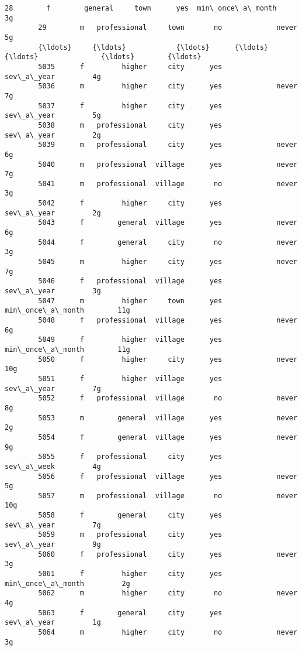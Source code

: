 \documentclass[11pt]{article}
\begin{document}
\begin{Verbatim}[commandchars=\\\{\}]
        28        f        general     town      yes  min\_once\_a\_month         3g   
        29        m   professional     town       no             never         5g   
        {\ldots}     {\ldots}            {\ldots}      {\ldots}      {\ldots}               {\ldots}        {\ldots}   
        5035      f         higher     city      yes        sev\_a\_year         4g   
        5036      m         higher     city      yes             never         7g   
        5037      f         higher     city      yes        sev\_a\_year         5g   
        5038      m   professional     city      yes        sev\_a\_year         2g   
        5039      m   professional     city      yes             never         6g   
        5040      m   professional  village      yes             never         7g   
        5041      m   professional  village       no             never         3g   
        5042      f         higher     city      yes        sev\_a\_year         2g   
        5043      f        general  village      yes             never         6g   
        5044      f        general     city       no             never         3g   
        5045      m         higher     city      yes             never         7g   
        5046      f   professional  village      yes        sev\_a\_year         3g   
        5047      m         higher     town      yes  min\_once\_a\_month        11g   
        5048      f   professional  village      yes             never         6g   
        5049      f         higher  village      yes  min\_once\_a\_month        11g   
        5050      f         higher     city      yes             never        10g   
        5051      f         higher  village      yes        sev\_a\_year         7g   
        5052      f   professional  village       no             never         8g   
        5053      m        general  village      yes             never         2g   
        5054      f        general  village      yes             never         9g   
        5055      f   professional     city      yes        sev\_a\_week         4g   
        5056      f   professional  village      yes             never         5g   
        5057      m   professional  village       no             never        10g   
        5058      f        general     city      yes        sev\_a\_year         7g   
        5059      m   professional     city      yes        sev\_a\_year         9g   
        5060      f   professional     city      yes             never         3g   
        5061      f         higher     city      yes  min\_once\_a\_month         2g   
        5062      m         higher     city       no             never         4g   
        5063      f        general     city      yes        sev\_a\_year         1g   
        5064      m         higher     city       no             never         3g   
        

\end{Verbatim}
\end{document}
